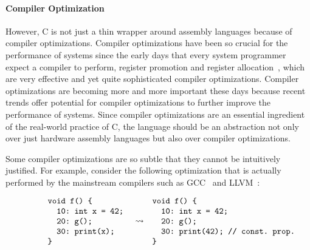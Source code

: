 \paragraph{Compiler Optimization}

However, C is not just a thin wrapper around assembly languages because of compiler optimizations.
Compiler optimizations have been so crucial for the performance of systems since the early days that
every system programmer expect a compiler to perform, \eg{} register promotion and register
allocation~\cite{reg-prom, reg-alloc}, which are very effective and yet quite sophisticated compiler
optimizations.  Compiler optimizations are becoming more and more important these days because
recent trends offer potential for compiler optimizations to further improve the performance of
systems.  Since compiler optimizations are an essential ingredient of the real-world practice of C,
the language should be an abstraction not only over just hardware assembly languages but also over
compiler optimizations.



Some compiler optimizations are so subtle that they cannot be intuitively justified.  For example,
consider the following optimization that is actually performed by the mainstream compilers such as
GCC~\cite{gcc} and LLVM~\cite{llvm}:

\[\begin{array}{rcl}
\begin{minipage}{0.27\textwidth}
\begin{verbatim}
void f() {
  10: int x = 42;
  20: g();
  30: print(x);
}
\end{verbatim}
\end{minipage}
&
\optarrow
&
\begin{minipage}{0.4\textwidth}
\begin{verbatim}
void f() {
  10: int x = 42;
  20: g();
  30: print(42); // const. prop.
}
\end{verbatim}
\end{minipage}
\end{array}\]

